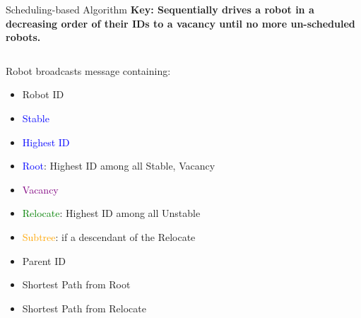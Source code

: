 \begin{frame}{Scheduling-based Algorithm}
  \textbf{\small{Key: Sequentially drives a robot in a decreasing order of their IDs to a vacancy until no more un-scheduled robots.}}
  \begin{columns}[T] %
    \begin{column}{.55\textwidth}
      \small{
        Robot broadcasts message containing:
        \begin{itemize}
        \item Robot ID
        \item \textcolor{blue}{Stable}
        \item \textcolor{blue}{Highest ID} 
        \item \textcolor{blue}{Root}: Highest ID among all Stable, Vacancy
        \item \textcolor{purple}{Vacancy}
        \item \textcolor{green}{Relocate}: Highest ID among all Unstable
        \item \textcolor{orange}{Subtree}: if a descendant of the Relocate
        \item Parent ID
        \item Shortest Path from Root
        \item Shortest Path from Relocate 
        \end{itemize}
      }
    \end{column}%
    \begin{column}{.35\textwidth}
      
    \end{column}%
  \end{columns}
\end{frame}